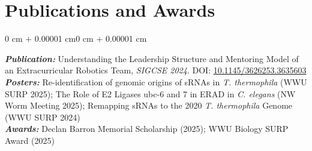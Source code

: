 \documentclass[10pt]{article}
\newenvironment{onecolentry}{
    \begin{adjustwidth}{0 cm + 0.00001 cm}{0 cm + 0.00001 cm}
}{
    \end{adjustwidth}
}
\let\hrefWithoutArrow\href
\begin{document}
\section{Publications and Awards}
\vspace{0.05 cm}
\begin{onecolentry}
	\textbf{\textit{Publication:}} Understanding the Leadership Structure and Mentoring Model of an Extracurricular Robotics Team, \textit{SIGCSE 2024}. DOI: \hrefWithoutArrow{https://dl.acm.org/doi/10.1145/3626253.3635603}{10.1145/3626253.3635603} \\
	\textbf{\textit{Posters:}} Re-identification of genomic origins of sRNAs in \textit{T. thermophila} (WWU SURP 2025); The Role of E2 Ligases ubc-6 and 7 in ERAD in \textit{C. elegans} (NW Worm Meeting 2025); Remapping sRNAs to the 2020 \textit{T. thermophila} Genome (WWU SURP 2024)	\\
\textbf{\textit{Awards:}} Declan Barron Memorial Scholarship (2025); WWU Biology SURP Award (2025)

\end{onecolentry}
\end{document}
